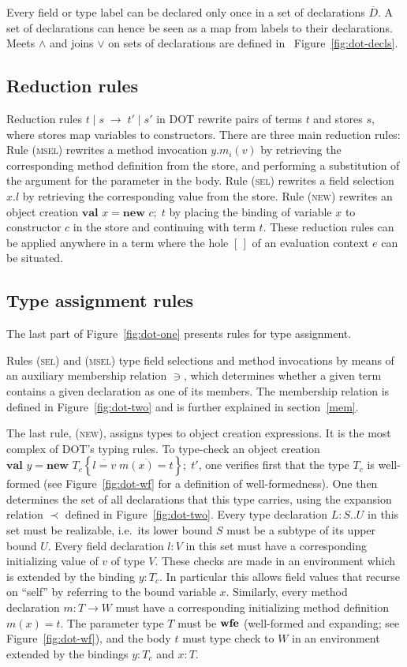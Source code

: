 \documentclass[9pt]{sigplanconf}
\newcommand{\figref}[1]
        {Figure~\ref{fig:#1}}
\newcommand{\expand}{\prec}
\newcommand{\reduces}{\;\rightarrow\;}
\newcommand{\nswfe}{\mbox{\textbf{wfe}}}
\newcommand{\tfun}{\rightarrow}
\newcommand{\ldefs}[1]{\left\{#1\right\}}
\newcommand{\seq}[1]{\overline{#1}}
\newcommand{\mapp}[3]{#1.#2(#3)}
\newcommand{\new}[3]{\textbf{val }#1 = \textbf{new }#2 ;\; #3}
\newcommand{\Ldecl}[3]{#1 : #2..#3}%
\newcommand{\ldecl}[2]{#1 : #2}
\newcommand{\mdecl}[3]{#1 : #2 \tfun #3}
\newcommand{\reduction}[4]{#1 \operatorname{|} #2 \reduces #3 \operatorname{|} #4}
\begin{document}
Every field or type label can be declared only once in a set of
declarations $\seq D$. A set of declarations can hence be seen as a map from
labels to their declarations.  Meets $\wedge$ and joins $\vee$ on sets of
declarations are defined in ~\figref{dot-decls}.

\subsection{Reduction rules}

Reduction rules $\reduction t s {t'} {s'}$ in DOT rewrite pairs of
terms $t$ and stores $s$, where stores map variables to constructors.
There are three main reduction rules: Rule (\textsc{msel}) rewrites a
method invocation $\mapp y {m_i} v$ by retrieving the corresponding method
definition from the store, and performing a substitution of the
argument for the parameter in the body. Rule (\textsc{sel}) rewrites a
field selection $x.l$ by retrieving the corresponding value from the
store. Rule (\textsc{new}) rewrites an object creation $\new x c t$ by
placing the binding of variable $x$ to constructor $c$ in the store
and continuing with term $t$.  These reduction rules can be applied
anywhere in a term where the hole $[\,]$ of an evaluation context $e$
can be situated.

\subsection{Type assignment rules}

The last part of \figref{dot-one} presents rules for type
assignment.  

Rules (\textsc{sel}) and (\textsc{msel}) type field selections and
method invocations by means of an auxiliary membership relation $\ni$,
which determines whether a given term contains a given declaration as
one of its members. The membership relation is defined in
\figref{dot-two} and is further explained in section~\ref{mem}.

The last rule, (\textsc{new}), assigns types to object creation
expressions. It is the most complex of DOT's typing rules.  To
type-check an object creation $\new y {T_c \ldefs {\seq{l =
      v}\;\seq{m(x) = t}}} t'$, one verifies first that the type $T_c$
is well-formed (see \figref{dot-wf} for a definition of
well-formedness).  One then determines the set of all declarations
that this type carries, using the expansion relation $\expand$ defined
in \figref{dot-two}.  Every type declaration $\Ldecl L S U$ in
this set must be realizable, i.e.\ its lower bound $S$ must be a
subtype of its upper bound $U$.  Every field declaration $\ldecl l V$
in this set must have a corresponding initializing value of $v$ of
type $V$.  These checks are made in an environment which is extended
by the binding $y: T_c$. In particular this allows field values that
recurse on ``self'' by referring to the bound variable $x$. Similarly,
every method declaration $\mdecl m T W$ must have a corresponding
initializing method definition $m(x) = t$. The parameter type $T$ must
be $\nswfe$ (well-formed and expanding; see \figref{dot-wf}), and
the body $t$ must type check to $W$ in an environment extended by the
bindings $y : T_c$ and $x : T$.
\end{document}
